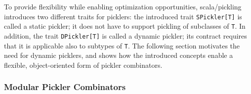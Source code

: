 \documentclass[preprint,10pt]{sigplanconf}
\theoremstyle{definition}
\theoremstyle{definition}
\newcommand{\term}[1]{\mbox{\texttt{#1}}}
\begin{document}
To provide flexibility while enabling optimization opportunities,
scala/pickling introduces two different traits for picklers: the introduced
trait \verb|SPickler[T]| is called a static pickler; it does not have to
support pickling of subclasses of \verb|T|. In addition, the trait
\verb|DPickler[T]| is called a dynamic pickler; its contract requires that it
is applicable also to subtypes of \verb|T|. The following section motivates
the need for dynamic picklers, and shows how the introduced concepts enable a
flexible, object-oriented form of pickler combinators.








\subsubsection{Modular Pickler Combinators}

\end{document}
